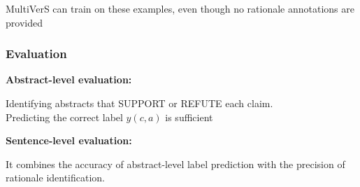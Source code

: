 \documentclass[13.5pt,aspecratio=169, xcolor=dvipsnames]{beamer}
\begin{document}
\begin{frame}
\begin{minipage}[t]{0.54\textwidth}
{            \vspace*{-2em}
             {
                \begin{center}
                    \begin{minipage}{0.9\textwidth}
                        \begin{block}{}
                            MultiVerS can train on these examples, even though no rationale annotations are provided
                        \end{block}
                    \end{minipage}
                \end{center}
            }
            }
        \end{minipage}
       


    
    
\end{frame}

\begin{frame}
    \onehalfspacing
        \frametitle{Evaluation}
        \textbf{Abstract-level evaluation:}
        \vspace*{-1em} 
        \begin{mybox}
                \textbullet \hspace{0.3em} Identifying abstracts that SUPPORT or REFUTE each claim. \\
                \textbullet \hspace{0.3em} Predicting the correct label $y(c, a)$ is sufficient
        \end{mybox}

        \bigskip

        \textbf{Sentence-level evaluation:}
        \vspace*{-1em} 
        \begin{mybox}
                \textbullet \hspace{0.3em} It combines the accuracy of abstract-level label prediction with the precision of rationale identification.
        \end{mybox}

    
\end{frame}
\end{document}
